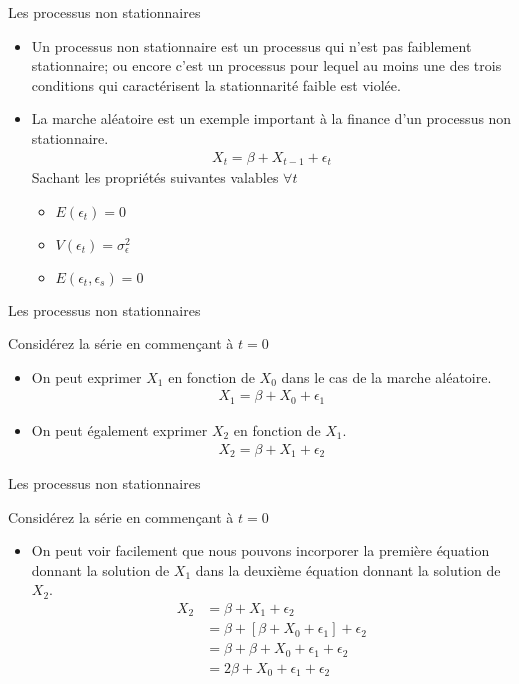 \documentclass{beamer}
\begin{document}
\begin{frame}{Les processus non stationnaires}
\begin{itemize}
\item Un processus non stationnaire est un processus qui n’est pas faiblement stationnaire; ou encore c’est un processus pour lequel au moins une des trois conditions qui caractérisent la stationnarité faible est violée.
\item La marche aléatoire est un exemple important à la finance d’un processus non stationnaire.
\begin{align*}
X_t=\beta+X_{t-1}+\epsilon_t
\end{align*}
Sachant les propriétés suivantes valables $\forall t$
\begin{itemize}
\item $E(\epsilon_t)=0$
\item $V(\epsilon_t)=\sigma_{\epsilon}^2$
\item $E(\epsilon_t,\epsilon_s)=0$ 
\end{itemize}
\end{itemize}
\end{frame}

\begin{frame}{Les processus non stationnaires}
\begin{block}{Considérez la série en commençant à $t=0$}
\begin{itemize}
\item On peut exprimer $X_1$ en fonction de $X_0$ dans le cas de la marche aléatoire.
\begin{align*}
X_1= \beta+ X_0+\epsilon_{1}
\end{align*}
\item On peut également exprimer $X_2$ en fonction de $X_1$.
\begin{align*}
X_2= \beta+ X_1+\epsilon_{2}
\end{align*}
\end{itemize}
\end{block}
\end{frame}

\begin{frame}{Les processus non stationnaires}
\begin{block}{Considérez la série en commençant à $t=0$}
\begin{itemize}
\item On peut voir facilement que nous pouvons incorporer la première équation donnant la solution de $X_1$ dans la deuxième équation donnant la solution de $X_2$.
\begin{align*}
X_2 & = \beta+ X_1+\epsilon_{2} \\ 
& = \beta+ [\beta+ X_0+\epsilon_{1}]+\epsilon_{2} \\
& = \beta + \beta +X_0 + \epsilon_1 +\epsilon_2 \\
& = 2 \beta + X_0 + \epsilon_1 +\epsilon_2 
\end{align*}
\end{itemize}

\end{block}
\end{frame}
\end{document}
